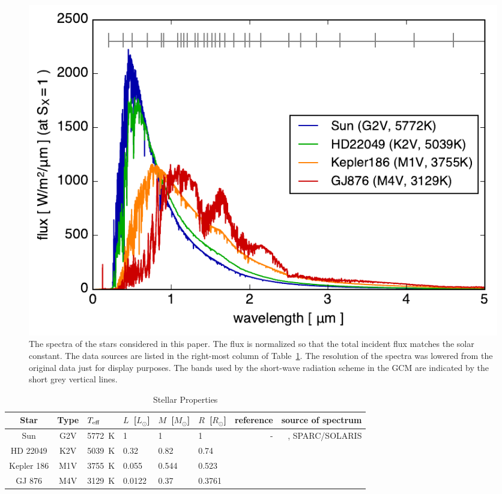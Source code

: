 \documentclass[11pt,numberedappendix,twocolappendix,]{emulateapj}
\begin{document}
\begin{figure}[!bh]
    \begin{center}
    \includegraphics[width=\hsize]{star_spectra.pdf}
    \end{center}
\caption{The spectra of the stars considered in this paper. The flux is normalized so that the total incident flux matches the solar constant. The data sources are listed in the right-most column of Table~\ref{tbl:stellar_properties}. The resolution of the spectra was lowered from the original data just for display purposes. The bands used by the short-wave radiation scheme in the GCM are indicated by the short grey vertical lines.}
\label{fig:star_spectra}
\end{figure}



\begin{table}[btp]
\caption{Stellar Properties}
\begin{center}
\begin{tabular}{ccllllrr} \hline \hline
%
Star & Type & $T_{\rm eff}$ & $L$~[$L_{\odot}$] & $M$~[$M_{\odot}$] & $R$~[$R_{\odot}$] & reference & source of spectrum \\ \hline
%
Sun & G2V & 5772~K & 1 & 1 & 1 & - & \citet{Lean2005}, SPARC/SOLARIS\footnotemark[1] \\ 
%
HD 22049 & K2V & 5039~K & 0.32 & 0.82 & 0.74 & \citet{Baines2012} & \citet{Segura2003} \\
%
Kepler 186 & M1V & 3755~K & 0.055 & 0.544 & 0.523 & \citet{Torres2015} & \citet{Allard2012} \\
%
GJ 876 & M4V & 3129~K & 0.0122 & 0.37 & 0.3761 & \citet{vonBraun2014} & \citet{Domagal-Goldman2014} \\ \hline
\end{tabular}
\end{center}
\label{tbl:stellar_properties}
\end{table}%
\end{document}
